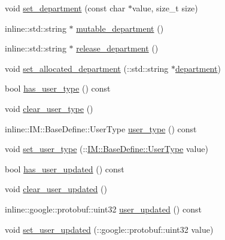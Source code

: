 \begin{DoxyCompactItemize}
void \hyperlink{class_i_m_1_1_base_define_1_1_client_user_info_ab707f962a51360f454fcf728321ccf92}{set\+\_\+department} (const char $\ast$value, size\+\_\+t size)
\item 
inline\+::std\+::string $\ast$ \hyperlink{class_i_m_1_1_base_define_1_1_client_user_info_a6d09cb5a09ea79fce4b00002319ce43f}{mutable\+\_\+department} ()
\item 
inline\+::std\+::string $\ast$ \hyperlink{class_i_m_1_1_base_define_1_1_client_user_info_af2408347aadbf764781fad5812283e45}{release\+\_\+department} ()
\item 
void \hyperlink{class_i_m_1_1_base_define_1_1_client_user_info_a5d791015a2e3bec3683f60f25333d1fd}{set\+\_\+allocated\+\_\+department} (\+::std\+::string $\ast$\hyperlink{class_i_m_1_1_base_define_1_1_client_user_info_ab77d3a5274727b8bf18d4cba269e8f89}{department})
\item 
bool \hyperlink{class_i_m_1_1_base_define_1_1_client_user_info_a7cc8b5614f15708ac4fd07d79906d052}{has\+\_\+user\+\_\+type} () const 
\item 
void \hyperlink{class_i_m_1_1_base_define_1_1_client_user_info_a4191f94717a74935d8af780d5b6806c4}{clear\+\_\+user\+\_\+type} ()
\item 
inline\+::\+I\+M\+::\+Base\+Define\+::\+User\+Type \hyperlink{class_i_m_1_1_base_define_1_1_client_user_info_a7f253850725dc0798fa2abf074fa4a48}{user\+\_\+type} () const 
\item 
void \hyperlink{class_i_m_1_1_base_define_1_1_client_user_info_a9b1934ca5ce27b41e0cbb1420ae49914}{set\+\_\+user\+\_\+type} (\+::\hyperlink{namespace_i_m_1_1_base_define_a6e0b9bb7c94e3e0e512f9dc7ca69cb83}{I\+M\+::\+Base\+Define\+::\+User\+Type} value)
\item 
bool \hyperlink{class_i_m_1_1_base_define_1_1_client_user_info_a226e1cc22aa7cf71c9976eb75395fd57}{has\+\_\+user\+\_\+updated} () const 
\item 
void \hyperlink{class_i_m_1_1_base_define_1_1_client_user_info_ac63bf4ccf9c7cacd2d03a0550456958f}{clear\+\_\+user\+\_\+updated} ()
\item 
inline\+::google\+::protobuf\+::uint32 \hyperlink{class_i_m_1_1_base_define_1_1_client_user_info_a3073b49898d060b9f9307e227bd486c8}{user\+\_\+updated} () const 
\item 
void \hyperlink{class_i_m_1_1_base_define_1_1_client_user_info_a06857a15a286e029e5baba0bb30f1e65}{set\+\_\+user\+\_\+updated} (\+::google\+::protobuf\+::uint32 value)
\end{DoxyCompactItemize}

